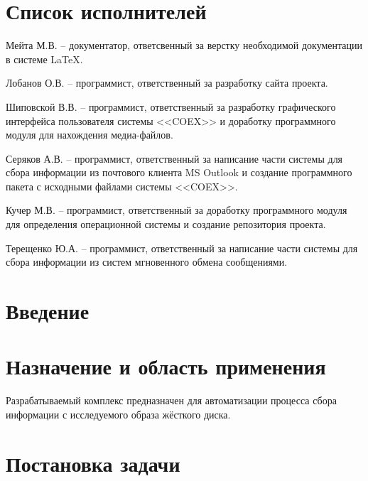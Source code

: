 


 
 
 
 \newpage
 \section*{Список исполнителей}
 
Мейта М.В. -- документатор, ответсвенный за верстку необходимой документации в системе \LaTeX.
 
Лобанов О.В. -- программист, ответственный за разработку сайта проекта. 

Шиповской В.В. -- программист, ответственный за разработку графического интерфейса пользователя системы <<COEX>> и доработку программного модуля для нахождения медиа-файлов.

Серяков А.В. -- программист, ответственный за написание части системы для сбора информации из почтового клиента MS Outlook и создание программного пакета с исходными файлами системы <<COEX>>.

Кучер М.В. -- программист, ответственный за доработку программного модуля для определения операционной системы и создание репозитория проекта.

Терещенко Ю.А. -- программист, ответственный за написание части системы для сбора информации из систем мгновенного обмена сообщениями.



 
 \newpage
 \tableofcontents

 \newpage
 \section*{Введение}
 

 \section{Назначение и область применения}
Разрабатываемый комплекс предназначен для автоматизации процесса сбора информации с исследуемого образа жёсткого диска.

\section{Постановка задачи}
\setcounter{figure}{0}


